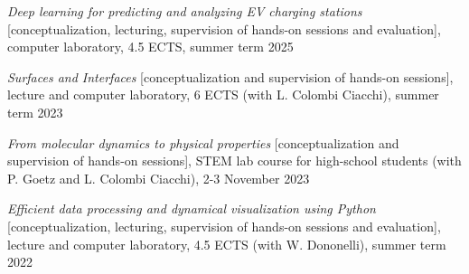\begin{etaremune}
    \item \textit{Deep learning for predicting and analyzing EV charging stations} [conceptualization, lecturing, supervision of hands-on sessions and evaluation], computer laboratory, 4.5 ECTS, summer term 2025
    \item \textit{Surfaces and Interfaces} [conceptualization and supervision of hands-on sessions], lecture and computer laboratory, 6 ECTS (with L. Colombi Ciacchi), summer term 2023
    \item \textit{From molecular dynamics to physical properties} [conceptualization and supervision of hands-on sessions], STEM lab course for high-school students (with P. Goetz and L. Colombi Ciacchi), 2-3 November 2023
    \item \textit{Efficient data processing and dynamical visualization using Python} [conceptualization, lecturing, supervision of hands-on sessions and evaluation], lecture and computer laboratory, 4.5 ECTS (with W. Dononelli), summer term 2022
\end{etaremune}
